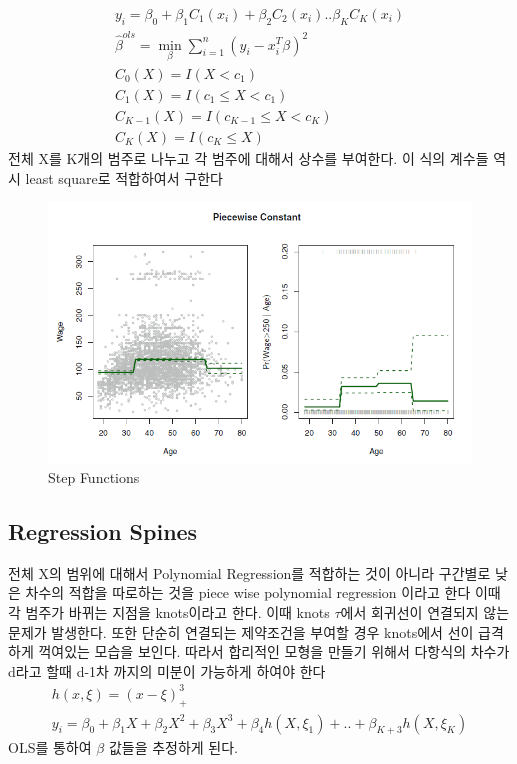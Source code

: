 \documentclass[11pt]{article}
\begin{document}
  \begin{align}
	y_{i} = \beta_{0} + \beta_{1}C_{1}(x_{i}) + \beta_{2}C_{2}(x_{i})  .. \beta_{K}C_{K}(x_{i})  \\
 	\hat{\beta}^{ols} = \min_{\beta} \sum\limits_{i=1}^n (y_{i} - x_{i}^T \beta)^2  \\
	C_{0}(X) = I(X<c_{1}) \\
	C_{1}(X) = I(c_{1} \leq X<c_{1}) \\
	C_{K-1}(X) = I(c_{K-1} \leq X<c_{K}) \\
	C_{K}(X) = I(c_{K} \leq X) 
  \end{align}
전체 X를 K개의 범주로 나누고 각 범주에 대해서 상수를 부여한다. 이 식의 계수들 역시 least square로 적합하여서 구한다
\begin{figure}[htbp]
\begin{center}
    \includegraphics[scale=1.2]{im2}
    \caption{Step Functions} \label{fig:label}
\end{center}
\end{figure}

\subsection{Regression Spines}
전체 X의 범위에 대해서 Polynomial Regression를 적합하는 것이 아니라 구간별로 낮은 차수의 적합을 따로하는 것을 piece wise polynomial regression 이라고 한다 이때 각 범주가 바뀌는 지점을 knots이라고 한다. 이때 knots $\tau$에서 회귀선이 연결되지 않는 문제가 발생한다. 또한 단순히 연결되는 제약조건을 부여할 경우 knots에서 선이 급격하게 꺽여있는 모습을 보인다. 따라서 합리적인 모형을 만들기 위해서 다항식의 차수가 d라고 할때 d-1차 까지의 미분이 가능하게 하여야 한다
  \begin{align}
h(x,\xi) = (x-\xi)^3_{+}\\
y_{i} = \beta_{0} + \beta_{1}X + \beta_{2}X^2 + \beta_{3}X^3   + \beta_{4}h(X,\xi_{1}) + .. + \beta_{K+3} h(X,\xi_{K})
  \end{align}
OLS를 통하여 $\beta$ 값들을 추정하게 된다.
\end{document}
